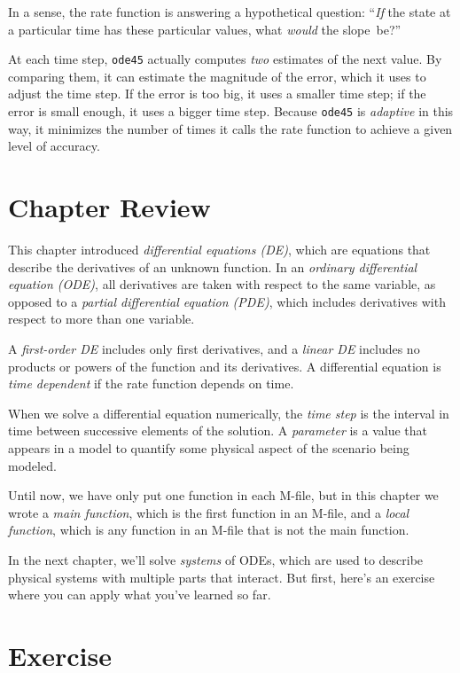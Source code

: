 \documentclass[../../book.tex]{subfiles}
\begin{document}
In a sense, the rate function is answering a hypothetical question: ``\emph{If} the state at a particular time has these particular values, what \emph{would} the slope~be?''


At each time step, \lstinline{ode45} actually computes \emph{two} estimates of the next value.
By comparing them, it can estimate the magnitude of the error,  which it uses to adjust the time step.
If the error is too big, it uses a smaller time step; if the error is small enough, it uses a bigger time step.
Because \lstinline{ode45} is \emph{adaptive} in this way, it minimizes the number of times it calls the rate function to achieve a given level of accuracy.




\section{Chapter Review}

This chapter introduced \emph{differential equations (DE)}, which are equations that describe the
derivatives of an unknown function.
In an \emph{ordinary differential equation (ODE)}, all derivatives are taken with
respect to the same variable, as opposed to a \emph{partial differential equation (PDE)}, which includes derivatives with respect to more than one variable.

A \emph{first-order DE} includes only first derivatives, and a \emph{linear DE} includes no products or powers of the function and its derivatives.
A differential equation is \emph{time dependent} if the rate function depends on time.

When we solve a differential equation numerically, the \emph{time step} is the interval in time between successive elements of the solution.
A \emph{parameter} is a value that appears in a model to quantify some
physical aspect of the scenario being modeled.

Until now, we have only put one function in each M-file, but in this chapter we wrote a \emph{main function}, which is the first function in an M-file, and a \emph{local function}, which is any function in an M-file that is not the main function.

In the next chapter, we'll solve \emph{systems} of ODEs, which are used to describe physical systems with multiple parts that interact.
But first, here's an exercise where you can apply what you've learned so far.


\section{Exercise}
\end{document}
